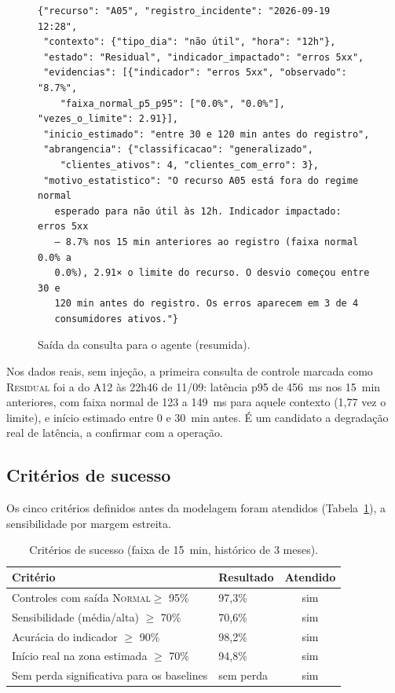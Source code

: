 \documentclass[sigconf,nonacm]{acmart}
\newcommand{\Normal}{\textsc{Normal}\xspace}
\newcommand{\Residual}{\textsc{Residual}\xspace}
\begin{document}
\begin{figure}[t]
\begin{Verbatim}[fontsize=\scriptsize,frame=single]
{"recurso": "A05", "registro_incidente": "2026-09-19 12:28",
 "contexto": {"tipo_dia": "não útil", "hora": "12h"},
 "estado": "Residual", "indicador_impactado": "erros 5xx",
 "evidencias": [{"indicador": "erros 5xx", "observado": "8.7%",
    "faixa_normal_p5_p95": ["0.0%", "0.0%"], "vezes_o_limite": 2.91}],
 "inicio_estimado": "entre 30 e 120 min antes do registro",
 "abrangencia": {"classificacao": "generalizado",
    "clientes_ativos": 4, "clientes_com_erro": 3},
 "motivo_estatistico": "O recurso A05 está fora do regime normal
   esperado para não útil às 12h. Indicador impactado: erros 5xx
   — 8.7% nos 15 min anteriores ao registro (faixa normal 0.0% a
   0.0%), 2.91× o limite do recurso. O desvio começou entre 30 e
   120 min antes do registro. Os erros aparecem em 3 de 4
   consumidores ativos."}
\end{Verbatim}
\caption{Saída da consulta para o agente (resumida).}
\label{fig:json}
\end{figure}

Nos dados reais, sem injeção, a primeira consulta de controle marcada como \Residual foi a do A12 às 22h46 de 11/09: latência p95 de 456~ms nos 15~min anteriores, com faixa normal de 123 a 149~ms para aquele contexto (1,77 vez o limite), e início estimado entre 0 e 30~min antes. É um candidato a degradação real de latência, a confirmar com a operação.

\subsection{Critérios de sucesso}
Os cinco critérios definidos antes da modelagem foram atendidos (Tabela~\ref{tab:criterios}), a sensibilidade por margem estreita.

\begin{table}[t]
  \caption{Critérios de sucesso (faixa de 15~min, histórico de 3 meses).}
  \label{tab:criterios}
  \small
  \begin{tabular}{p{}p{}c}
    \toprule
    Critério & Resultado & Atendido \\
    \midrule
    Controles com saída \Normal $\geq$ 95\% & 97,3\% & sim \\
    Sensibilidade (média/alta) $\geq$ 70\% & 70,6\% & sim \\
    Acurácia do indicador $\geq$ 90\% & 98,2\% & sim \\
    Início real na zona estimada $\geq$ 70\% & 94,8\% & sim \\
    Sem perda significativa para os baselines & sem perda & sim \\
    \bottomrule
  \end{tabular}
\end{table}
\end{document}
